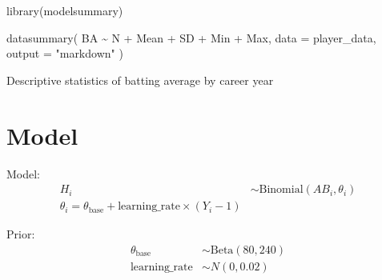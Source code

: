\documentclass[
  letterpaper,
  DIV=11,
  numbers=noendperiod]{scrartcl}
\newenvironment{Shaded}{\begin{snugshade}}{\end{snugshade}}
\newcommand{\AttributeTok}[1]{\textcolor[rgb]{0.40,0.45,0.13}{#1}}
\newcommand{\FunctionTok}[1]{\textcolor[rgb]{0.28,0.35,0.67}{#1}}
\newcommand{\NormalTok}[1]{\textcolor[rgb]{0.00,0.23,0.31}{#1}}
\newcommand{\SpecialCharTok}[1]{\textcolor[rgb]{0.37,0.37,0.37}{#1}}
\newcommand{\StringTok}[1]{\textcolor[rgb]{0.13,0.47,0.30}{#1}}
\begin{document}
\begin{Shaded}
\begin{Highlighting}[]
\FunctionTok{library}\NormalTok{(modelsummary)}

\FunctionTok{datasummary}\NormalTok{(}
\NormalTok{  BA }\SpecialCharTok{\textasciitilde{}}\NormalTok{ N }\SpecialCharTok{+}\NormalTok{ Mean }\SpecialCharTok{+}\NormalTok{ SD }\SpecialCharTok{+}\NormalTok{ Min }\SpecialCharTok{+}\NormalTok{ Max,}
  \AttributeTok{data =}\NormalTok{ player\_data,}
  \AttributeTok{output =} \StringTok{"markdown"}
\NormalTok{)}
\end{Highlighting}
\end{Shaded}

\begin{table}

\caption{\label{tbl-summ-var}Descriptive statistics of batting average
by career year}


\end{table}%

\section{Model}\label{model}

Model: \[
\begin{aligned}
H_i & \sim \text{Binomial}(AB_i, \theta_i) \\
\theta_i = \theta_{\text{base}} + \text{learning_rate} \times (Y_i - 1)
\end{aligned}
\]

Prior: \[
\begin{aligned}
\theta_{\text{base}} & \sim \text{Beta}(80, 240) \\
\text{learning_rate} & \sim N(0, 0.02) 
\end{aligned}
\]
\end{document}
